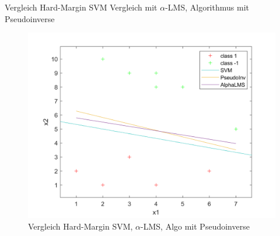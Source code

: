 \documentclass[ngerman]{beamer}
\begin{document}
\begin{frame}{Vergleich Hard-Margin SVM}
    Vergleich mit $\alpha$-LMS, Algorithmus mit Pseudoinverse \\ \pause
    \begin{center}
        \begin{figure}
            \includegraphics[width=\textwidth,height=0.7\textheight,keepaspectratio]{../code/octave/images/linearcompsmall}
            \caption{Vergleich Hard-Margin SVM, $\alpha$-LMS, Algo mit Pseudoinverse}
            \label{fig:comphardalphaps}
        \end{figure}
    \end{center}
\end{frame}
\end{document}
